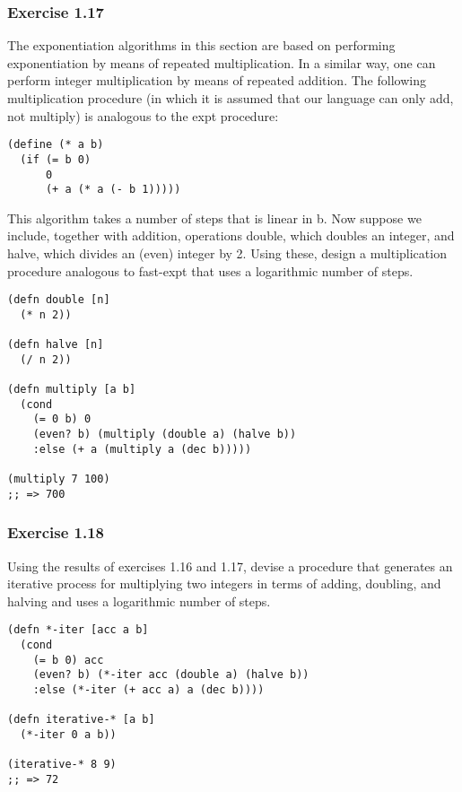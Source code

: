 \documentclass[11pt]{article}
\begin{document}
\subsubsection{Exercise 1.17}
\label{sec-2-4-2}
The exponentiation algorithms in this section are based on performing exponentiation by means of repeated multiplication. In a similar way, one can perform integer multiplication by means of repeated addition. The following multiplication procedure (in which it is assumed that our language can only add, not multiply) is analogous to the expt procedure:

\begin{verbatim}
(define (* a b)
  (if (= b 0)
      0
      (+ a (* a (- b 1)))))
\end{verbatim}

This algorithm takes a number of steps that is linear in b. Now suppose we include, together with addition, operations double, which doubles an integer, and halve, which divides an (even) integer by 2. Using these, design a multiplication procedure analogous to fast-expt that uses a logarithmic number of steps.

\begin{verbatim}
(defn double [n]
  (* n 2))

(defn halve [n]
  (/ n 2))

(defn multiply [a b]
  (cond
    (= 0 b) 0
    (even? b) (multiply (double a) (halve b))
    :else (+ a (multiply a (dec b)))))

(multiply 7 100)
;; => 700
\end{verbatim}

\subsubsection{Exercise 1.18}
\label{sec-2-4-3}
Using the results of exercises 1.16 and 1.17, devise a procedure that generates an iterative process for multiplying two integers in terms of adding, doubling, and halving and uses a logarithmic number of steps.

\begin{verbatim}
(defn *-iter [acc a b]
  (cond
    (= b 0) acc
    (even? b) (*-iter acc (double a) (halve b))
    :else (*-iter (+ acc a) a (dec b))))

(defn iterative-* [a b]
  (*-iter 0 a b))

(iterative-* 8 9)
;; => 72
\end{verbatim}
\end{document}
